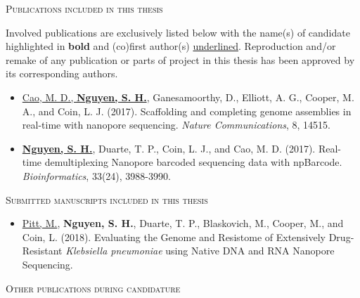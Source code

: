 \thispagestyle{plain}
\begin{center}
\Large \textsc{Publications included in this thesis}
\end{center}

Involved publications are exclusively listed below with the name(s) of candidate highlighted in \textbf{bold} and (co)first author(s) \underline{underlined}.
Reproduction and/or remake of any publication or parts of project in this thesis has been approved by its corresponding authors.

\begin{itemize}
\item \underline{Cao, M. D., \textbf{Nguyen, S. H.}}, Ganesamoorthy, D., Elliott, A. G., Cooper, M. A., and Coin, L. J. (2017). Scaffolding and completing genome assemblies in real-time with nanopore sequencing. \emph{Nature Communications}, 8, 14515. \label{pub:npscarf}
\item \underline{\textbf{Nguyen, S. H.}}, Duarte, T. P., Coin, L. J., and Cao, M. D. (2017). Real-time demultiplexing Nanopore barcoded sequencing data with npBarcode. \emph{Bioinformatics}, 33(24), 3988-3990. \label{pub:npbarcode}
\end{itemize}

\begin{center}
\Large \textsc{Submitted manuscripts included in this thesis}
\end{center}
\begin{itemize}
\item \underline{Pitt, M.}, \textbf{Nguyen, S. H.}, Duarte, T. P., Blaskovich, M., Cooper, M., and Coin, L. (2018). Evaluating the Genome and Resistome of Extensively Drug-Resistant \emph{Klebsiella pneumoniae} using Native DNA and RNA Nanopore Sequencing. 
\end{itemize}

\begin{center}
\Large \textsc{Other publications during candidature}
\end{center}
